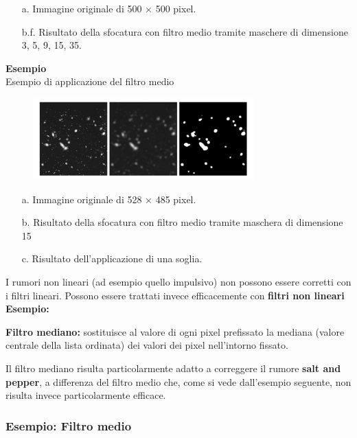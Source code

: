 \begin{enumerate}
    \item [a.] Immagine originale di 500 × 500 pixel.
    \item [b.f.] Risultato della sfocatura con filtro medio tramite maschere di
          dimensione 3, 5, 9, 15, 35.
\end{enumerate}
\textbf{Esempio}
\\
Esempio di applicazione del filtro medio
\begin{figure}[H]
    \centering
    \includegraphics[width=\linewidth, keepaspectratio]{capitoli/immagini/imgs/filtro-l-esempio2.png}
\end{figure}

\begin{enumerate}
    \item [a.] Immagine originale di 528 × 485 pixel.
    \item [b.] Risultato della sfocatura con filtro medio tramite maschera di dimensione 15
    \item [c.]  Risultato dell’applicazione di una soglia.
\end{enumerate}
I rumori non lineari (ad esempio quello impulsivo) non possono essere corretti con i filtri lineari.
Possono essere trattati invece efficacemente con \textbf{filtri non lineari}
\\
\textbf{Esempio:}
\begin{trivlist}
    \item \textbf{Filtro mediano:}  sostituisce al valore di ogni pixel prefissato la
    mediana (valore centrale della lista ordinata) dei
    valori dei pixel nell’intorno fissato.
\end{trivlist}
Il filtro mediano risulta particolarmente adatto a correggere il rumore \textbf{salt and pepper}, a differenza del filtro medio che, come si
vede dall’esempio seguente, non risulta invece particolarmente efficace.

\subsubsection{Esempio: Filtro medio}

